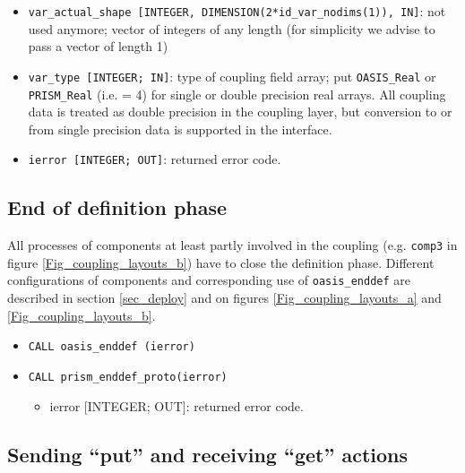 \begin{itemize}
\begin{itemize}
    \footnote{Parameters OASIS\_In, PRISM\_In, OASIS\_Out, PRISM\_Out
      are defined in
      oasis3-mct/lib/psmile/src/mod\_oasis\_parameters.F90}.
  \item {\tt var\_actual\_shape [INTEGER, DIMENSION(2*id\_var\_nodims(1)), IN]}:
    not used anymore; vector of integers of any length (for simplicity
    we advise to pass a vector of length 1)
  \item {\tt var\_type [INTEGER; IN]}: type of coupling field array;
    put {\tt OASIS\_Real} or {\tt PRISM\_Real} (i.e. = 4) for single
    or double precision real arrays.  All coupling data is treated as
    double precision in the coupling layer, but conversion to or from
    single precision data is supported in the interface.
  \item {\tt ierror [INTEGER; OUT]}: returned error code.
  \end{itemize}
\end{itemize}

\subsection{End of definition phase}
\label{subsubsec_Endofdefinition}
All processes of components at least partly involved in the coupling (e.g. {\tt comp3} in figure
    \ref{Fig_coupling_layouts_b}) have to close the definition phase. Different configurations of components and corresponding use of {\tt oasis\_enddef} are described in section \ref{sec_deploy} and on figures \ref{Fig_coupling_layouts_a} and \ref{Fig_coupling_layouts_b}.
\begin{itemize}
\item {\tt CALL oasis\_enddef (ierror)}
\item {\tt CALL prism\_enddef\_proto(ierror)}
  \begin{itemize}
  \item ierror [INTEGER; OUT]: returned error code.
  \end{itemize}
\end{itemize}


\subsection{Sending ``put'' and receiving ``get'' actions}
\label{subsubsec_sendingreceiving}

